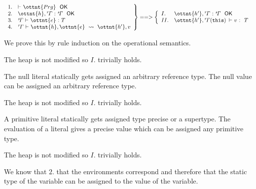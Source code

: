 \begin{theorem}
\label{enerj:thm:ts}
\[
\left.
\begin{array}{ll}
1. &  \textsf{$\vdash$} \  \ottnt{Prg} \ \  \textsf{OK} \\
2. &  \ottnt{h} ,  \mathit{ {^r}\!\Gamma} \  \textsf{:} \  \mathit{ {^s}\!\Gamma} \ \  \textsf{OK} \\
3. &  \mathit{ {^s}\!\Gamma} \  \textsf{$\vdash$} \  \ottnt{e} \  \textsf{:} \  T \\
4. &  \mathit{ {^r}\!\Gamma} \  \textsf{$\vdash$} \  \ottnt{h} ,  \ottnt{e} \ \leadsto\  \ottnt{h'} ,  v \\
\end{array}
\right\} ==> \left\{
\begin{array}{ll}
I.  &  \ottnt{h'} ,  \mathit{ {^r}\!\Gamma} \  \textsf{:} \  \mathit{ {^s}\!\Gamma} \ \  \textsf{OK} \\
II. &  \ottnt{h'} ,   \mathit{ {^r}\!\Gamma} \!\left( \texttt{\upshape{this}\,\!} \right)  \  \textsf{$\vdash$} \  v \  \textsf{:} \ \  T \\
\end{array}
\right.
\]
\end{theorem}


We prove this by rule induction on the operational semantics.


The heap is not modified so $I.$ trivially holds.

The null literal statically gets assigned an arbitrary reference type.
The null value can be assigned an arbitrary reference type.



The heap is not modified so $I.$ trivially holds.

A primitive literal statically gets assigned type precise or a supertype.
The evaluation of a literal gives a precise value which can be assigned any primitive type.



The heap is not modified so $I.$ trivially holds.

We know that $2.$ that the environments correspond and therefore that the static
type of the variable can be assigned to the value of the variable.



